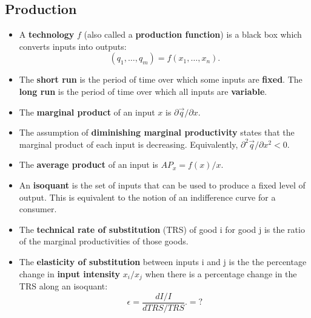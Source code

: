 \documentclass[a4paper]{article}
\begin{document}
\subsection{Production}
\begin{itemize}
    \item A \textbf{technology} $f$ (also called a \textbf{production function}) is a black box which converts inputs into outputs: $$(q_1, \hdots, q_m) = f(x_1, \hdots, x_n).$$
    \item The \textbf{short run} is the period of time over which some inputs are \textbf{fixed}. The \textbf{long run} is the period of time over which all inputs are \textbf{variable}.
    \item The \textbf{marginal product} of an input $x$ is $\partial \vec{q}/\partial x$.
    \item The assumption of \textbf{diminishing marginal productivity} states that the marginal product of each input is decreasing. Equivalently, $\partial^2 \vec{q}/\partial x^2 < 0$.
    \item The \textbf{average product} of an input is $AP_x = f(x) / x$.
    \item An \textbf{isoquant} is the set of inputs that can be used to produce a fixed level of output. This is equivalent to the notion of an indifference curve for a consumer.
    \item The \textbf{technical rate of substitution} (TRS) of good i for good j is the ratio of the marginal productivities of those goods.
    \item The \textbf{elasticity of substitution} between inputs i and j is the the percentage change in \textbf{input intensity} $x_i/x_j$ when there is a percentage change in the TRS along an isoquant: $$\epsilon = \frac{dI/I}{dTRS/TRS}. = ?$$
\end{itemize}
\end{document}
